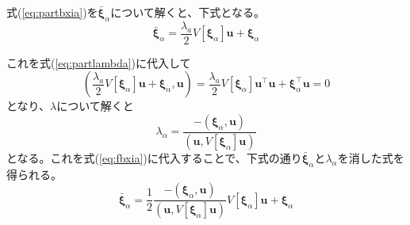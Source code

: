 \documentclass[12pt,a4j]{jsarticle}
\newcommand{\xia}{\bm{\xi}_\alpha}
\newcommand{\bxia}{\bar{\bm{\xi}}_\alpha}
\begin{document}
      式(\ref{eq:partbxia})を$\bxia$について解くと、下式となる。
      \begin{equation}
        \bxia = \frac{\lambda_a}{2}V[\xia]\bm{u} + \xia \label{eq:fbxia}
      \end{equation}
      
      これを式(\ref{eq:partlambda})に代入して
      \begin{equation}
        \left(\frac{\lambda_a}{2}V[\xia]\bm{u} + \xia, \bm{u} \right) = \frac{\lambda_a}{2}V[\xia]\bm{u}^\top\bm{u} + \xia^\top\bm{u} = 0 \label{eq:flambda}
      \end{equation}
      となり、$\lambda$について解くと
      \begin{equation}
        \lambda_\alpha = \frac{-(\xia, \bm{u})}{(\bm{u}, V[\xia]\bm{u})}
      \end{equation}
      となる。これを式(\ref{eq:fbxia})に代入することで、下式の通り$\bxia$と$\lambda_\alpha$を消した式を得られる。
      \begin{equation}
        \bxia = \frac{1}{2}\frac{-(\xia, \bm{u})}{(\bm{u}, V[\xia]\bm{u})}V[\xia]\bm{u} + \xia
      \end{equation}
\end{document}
